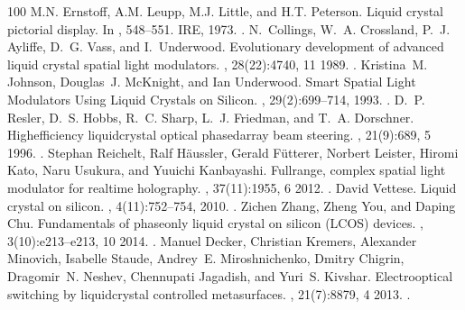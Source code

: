 \documentclass[a4paper,10pt,english,openany,oneside]{jupyterBook}
\begin{document}
\begin{sphinxthebibliography}{100}
\sphinxAtStartPar
M.N. Ernstoff, A.M. Leupp, M.J. Little, and H.T. Peterson. Liquid crystal pictorial display. In , 548–551. IRE, 1973. .
\sphinxAtStartPar
N. Collings, W. A. Crossland, P. J. Ayliffe, D. G. Vass, and I. Underwood. Evolutionary development of advanced liquid crystal spatial light modulators. , 28(22):4740, 11 1989. .
\sphinxAtStartPar
Kristina M. Johnson, Douglas J. McKnight, and Ian Underwood. Smart Spatial Light Modulators Using Liquid Crystals on Silicon. , 29(2):699–714, 1993. .
\sphinxAtStartPar
D. P. Resler, D. S. Hobbs, R. C. Sharp, L. J. Friedman, and T. A. Dorschner. High\sphinxhyphen{}efficiency liquid\sphinxhyphen{}crystal optical phased\sphinxhyphen{}array beam steering. , 21(9):689, 5 1996. .
\sphinxAtStartPar
Stephan Reichelt, Ralf Häussler, Gerald Fütterer, Norbert Leister, Hiromi Kato, Naru Usukura, and Yuuichi Kanbayashi. Full\sphinxhyphen{}range, complex spatial light modulator for real\sphinxhyphen{}time holography. , 37(11):1955, 6 2012. .
\sphinxAtStartPar
David Vettese. Liquid crystal on silicon. , 4(11):752–754, 2010. .
\sphinxAtStartPar
Zichen Zhang, Zheng You, and Daping Chu. Fundamentals of phase\sphinxhyphen{}only liquid crystal on silicon (LCOS) devices. , 3(10):e213–e213, 10 2014. .
\sphinxAtStartPar
Manuel Decker, Christian Kremers, Alexander Minovich, Isabelle Staude, Andrey E. Miroshnichenko, Dmitry Chigrin, Dragomir N. Neshev, Chennupati Jagadish, and Yuri S. Kivshar. Electro\sphinxhyphen{}optical switching by liquid\sphinxhyphen{}crystal controlled metasurfaces. , 21(7):8879, 4 2013. .

\end{sphinxthebibliography}
\end{document}
